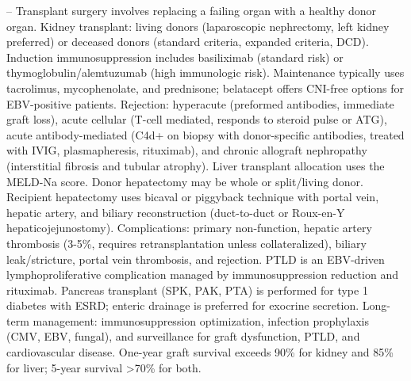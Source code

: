 -- Transplant surgery involves replacing a failing organ with a healthy donor organ. Kidney transplant: living donors (laparoscopic nephrectomy, left kidney preferred) or deceased donors (standard criteria, expanded criteria, DCD). Induction immunosuppression includes basiliximab (standard risk) or thymoglobulin/alemtuzumab (high immunologic risk). Maintenance typically uses tacrolimus, mycophenolate, and prednisone; belatacept offers CNI-free options for EBV-positive patients. Rejection: hyperacute (preformed antibodies, immediate graft loss), acute cellular (T-cell mediated, responds to steroid pulse or ATG), acute antibody-mediated (C4d+ on biopsy with donor-specific antibodies, treated with IVIG, plasmapheresis, rituximab), and chronic allograft nephropathy (interstitial fibrosis and tubular atrophy). Liver transplant allocation uses the MELD-Na score. Donor hepatectomy may be whole or split/living donor. Recipient hepatectomy uses bicaval or piggyback technique with portal vein, hepatic artery, and biliary reconstruction (duct-to-duct or Roux-en-Y hepaticojejunostomy). Complications: primary non-function, hepatic artery thrombosis (3-5\%, requires retransplantation unless collateralized), biliary leak/stricture, portal vein thrombosis, and rejection. PTLD is an EBV-driven lymphoproliferative complication managed by immunosuppression reduction and rituximab. Pancreas transplant (SPK, PAK, PTA) is performed for type 1 diabetes with ESRD; enteric drainage is preferred for exocrine secretion. Long-term management: immunosuppression optimization, infection prophylaxis (CMV, EBV, fungal), and surveillance for graft dysfunction, PTLD, and cardiovascular disease. One-year graft survival exceeds 90\% for kidney and 85\% for liver; 5-year survival >70\% for both.

